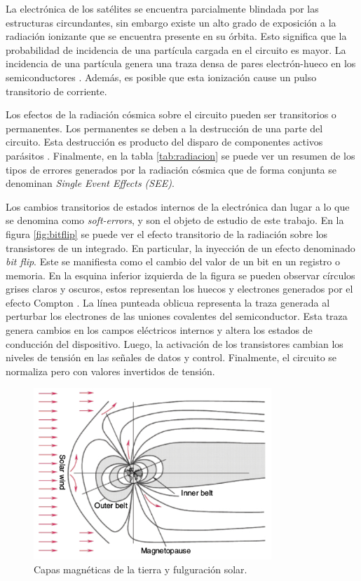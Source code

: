 La electrónica de los satélites se encuentra parcialmente blindada por las estructuras circundantes, sin embargo existe un alto grado de exposición a la radiación ionizante que se encuentra presente en su órbita.
Esto significa que la probabilidad de incidencia de una partícula cargada en el circuito es mayor.
La incidencia de una partícula genera una traza densa de pares electrón-hueco en los semiconductores \citep{ARTICLE:velazco}.
Además, es posible que esta ionización cause un pulso transitorio de corriente.

Los efectos de la radiación cósmica sobre el circuito pueden ser transitorios o permanentes.
Los permanentes se deben a la destrucción de una parte del circuito.
Esta destrucción es producto del disparo de componentes activos parásitos \citep{WEBSITE:effects_on_devices}.
Finalmente, en la tabla \ref{tab:radiacion} se puede ver un resumen de los tipos de errores generados por la radiación cósmica que de forma conjunta se denominan \emph{Single Event Effects (SEE)}.

Los cambios transitorios de estados internos de la electrónica dan lugar a lo que se denomina como \emph{soft-errors}, y son el objeto de estudio de este trabajo.
En la figura \ref{fig:bitflip} se puede ver el efecto transitorio de la radiación sobre los transistores de un integrado.
En particular, la inyección de un efecto denominado \emph{bit flip}.
Este se manifiesta como el cambio del valor de un bit en un registro o memoria.
En la esquina inferior izquierda de la figura se pueden observar círculos grises claros y oscuros, estos representan los huecos y electrones generados por el efecto Compton \citep{BOOK:comptom}.
La línea punteada oblicua representa la traza generada al perturbar los electrones de las uniones covalentes del semiconductor.
Esta traza genera cambios en los campos eléctricos internos y altera los estados de conducción del dispositivo.
Luego, la activación de los transistores cambian los niveles de tensión en las señales de datos y control.
Finalmente, el circuito se normaliza pero con valores invertidos de tensión.

\begin{figure}[htbp]
	\centering
	\includegraphics[width=0.8\textwidth]{./Figures/vientosolar.jpg}
    \caption{Capas magnéticas de la tierra y fulguración solar\protect\footnotemark.}
	\label{fig:viento}
\end{figure}

